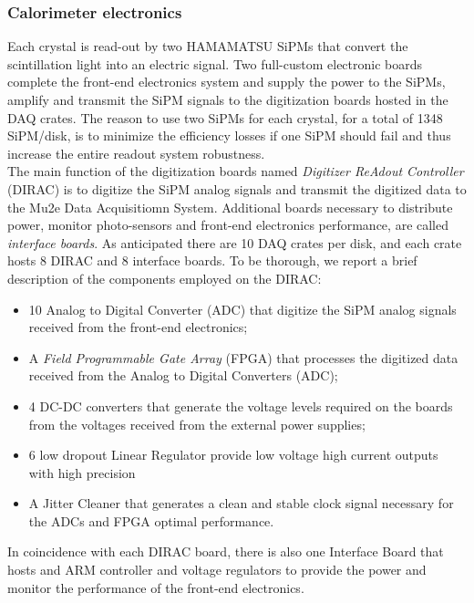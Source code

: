 \documentclass[12pt,a4paper,openright, oneside, titlepage]{book} %
\begin{document}
\subsubsection{Calorimeter electronics}
Each crystal is read-out by two HAMAMATSU SiPMs that convert the scintillation light
into an electric signal. Two full-custom electronic boards complete the front-end electronics system
and supply the power to the SiPMs, amplify and transmit the SiPM signals to the digitization boards
hosted in the DAQ crates. 
The reason to use two SiPMs for each crystal, for a total of 1348 SiPM/disk, 
is to minimize the efficiency losses if one SiPM should fail and thus increase the entire readout
system robustness.\\ 
The main function of the digitization boards named  \textit{Digitizer ReAdout Controller} (DIRAC) 
is to digitize the SiPM analog signals and transmit the digitized data to the Mu2e Data Acquisitiomn System.
Additional boards necessary to distribute power, monitor photo-sensors and front-end electronics  performance, 
are called \textit{interface boards}. 
As anticipated there are 10 DAQ crates per disk, and each crate hosts 8 DIRAC and 8 interface boards. 
To be thorough, we report a brief description of the components employed on the DIRAC:
\begin{itemize}
\item 10 Analog to Digital Converter (ADC) that  digitize the SiPM analog signals received 
from the front-end electronics;
\item A \textit{Field Programmable Gate Array} (FPGA) that processes the digitized data received from  
the Analog to Digital Converters (ADC);
\item 4 DC-DC converters that generate the voltage levels required on the boards from the voltages
received from the external power supplies; 
\item 6 low dropout Linear Regulator provide low voltage high current
outputs with high precision
\item A Jitter Cleaner that generates a clean and stable clock signal necessary for the ADCs and FPGA optimal performance.
\end{itemize}
In coincidence with each DIRAC board, there is also one Interface Board that hosts and ARM controller 
and voltage regulators to provide the power and monitor the performance of the front-end electronics.
\end{document}
